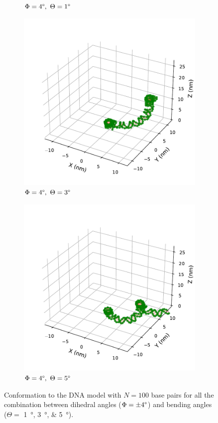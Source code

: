 \documentclass[a4paper,10pt]{article}
\begin{document}
\begin{figure}[tb]
\begin{subfigure}{0.3\textwidth}
\caption{$\Phi=4\degree,\ \Theta=1\degree$}
\label{fig:bend_d}
\end{subfigure}
\begin{subfigure}{0.3\textwidth}
\includegraphics[width=\textwidth]{bw_4_3.pdf}
\caption{$\Phi=4\degree,\ \Theta=3\degree$}
\label{fig:bend_e}
\end{subfigure}
\begin{subfigure}{0.3\textwidth}
\includegraphics[width=\textwidth]{bw_4_5.pdf}
\caption{$\Phi=4\degree,\ \Theta=5\degree$}
\label{fig:bend_f}
\end{subfigure}
\caption{Conformation to the DNA model with $N=100$ base pairs for all the combination between dihedral angles ($\Phi=\pm 4\degree$) and bending angles ($\Theta=$ \SIlist{1;3;5}{\degree}).}
\label{fig:bend}
\end{figure}
\end{document}
